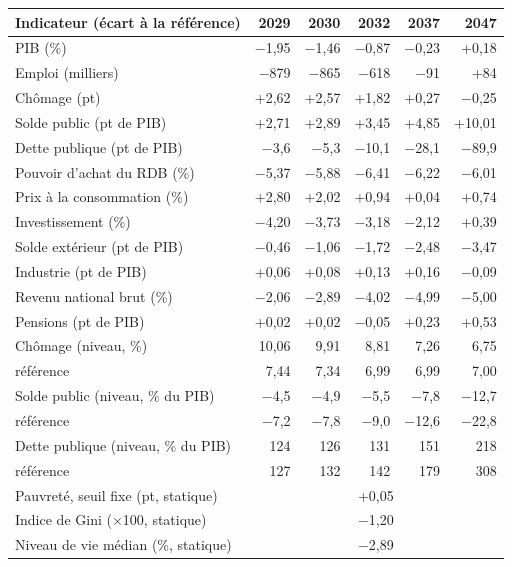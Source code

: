 \begin{tabular}{lrrrrr}
\toprule
Indicateur (écart à la référence) & 2029 & 2030 & 2032 & 2037 & 2047 \\
\midrule
PIB (\%) & $-$1{,}95 & $-$1{,}46 & $-$0{,}87 & $-$0{,}23 & +0{,}18 \\
Emploi (milliers) & $-$879 & $-$865 & $-$618 & $-$91 & +84 \\
Chômage (pt) & +2{,}62 & +2{,}57 & +1{,}82 & +0{,}27 & $-$0{,}25 \\
Solde public (pt de PIB) & +2{,}71 & +2{,}89 & +3{,}45 & +4{,}85 & +10{,}01 \\
Dette publique (pt de PIB) & $-$3{,}6 & $-$5{,}3 & $-$10{,}1 & $-$28{,}1 & $-$89{,}9 \\
Pouvoir d'achat du RDB (\%) & $-$5{,}37 & $-$5{,}88 & $-$6{,}41 & $-$6{,}22 & $-$6{,}01 \\
Prix à la consommation (\%) & +2{,}80 & +2{,}02 & +0{,}94 & +0{,}04 & +0{,}74 \\
Investissement (\%) & $-$4{,}20 & $-$3{,}73 & $-$3{,}18 & $-$2{,}12 & +0{,}39 \\
Solde extérieur (pt de PIB) & $-$0{,}46 & $-$1{,}06 & $-$1{,}72 & $-$2{,}48 & $-$3{,}47 \\
Industrie (pt de PIB) & +0{,}06 & +0{,}08 & +0{,}13 & +0{,}16 & $-$0{,}09 \\
Revenu national brut (\%) & $-$2{,}06 & $-$2{,}89 & $-$4{,}02 & $-$4{,}99 & $-$5{,}00 \\
Pensions (pt de PIB) & +0{,}02 & +0{,}02 & $-$0{,}05 & +0{,}23 & +0{,}53 \\
\midrule
Chômage (niveau, \%) & 10{,}06 & 9{,}91 & 8{,}81 & 7{,}26 & 6{,}75 \\
\quad référence & 7{,}44 & 7{,}34 & 6{,}99 & 6{,}99 & 7{,}00 \\
Solde public (niveau, \% du PIB) & $-$4{,}5 & $-$4{,}9 & $-$5{,}5 & $-$7{,}8 & $-$12{,}7 \\
\quad référence & $-$7{,}2 & $-$7{,}8 & $-$9{,}0 & $-$12{,}6 & $-$22{,}8 \\
Dette publique (niveau, \% du PIB) & 124 & 126 & 131 & 151 & 218 \\
\quad référence & 127 & 132 & 142 & 179 & 308 \\
\midrule
Pauvreté, seuil fixe (pt, statique) & \multicolumn{5}{c}{+0{,}05} \\
Indice de Gini ($\times$100, statique) & \multicolumn{5}{c}{$-$1{,}20} \\
Niveau de vie médian (\%, statique) & \multicolumn{5}{c}{$-$2{,}89} \\
\bottomrule
\end{tabular}
